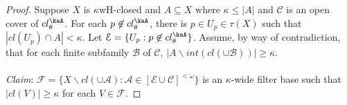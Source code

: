 \documentclass[11pt]{amsart}
\theoremstyle{definition}
\theoremstyle{remark}
\numberwithin{equation}{section}
\begin{document}
\begin{proof} 
Suppose $X$ is $\kappa$wH-closed and  $A \subseteq X$ where $\kappa \leq |A|$ and ${\ensuremath{\mathcal{{C}}}}$ is an open cover of $cl_{\theta }^\kaA $.  For each $p \not\in cl_{\theta }^\kaA $, there is $p \in U_p \in\tau(X)$ such that  $|cl(U_p) \cap A| < \kappa$.  Let ${\ensuremath{\mathcal{{E}}}} = \{ U_p: p \not\in cl_{\theta }^\kaA \}$.   Assume, by way of contradiction, that for each  finite subfamily ${\ensuremath{\mathcal{{B}}}}$ of ${\ensuremath{\mathcal{{C}}}}$,  $|A\backslash int(cl(\cup{\ensuremath{\mathcal{{B}}}}))| \geq \kappa$.\\\\
\emph{Claim}: ${\ensuremath{\mathcal{{F}}}} = \{X\backslash cl(\cup{\ensuremath{\mathcal{A}}}): {\ensuremath{\mathcal{A}}} \in  [{\ensuremath{\mathcal{{E}}}} \cup {\ensuremath{\mathcal{{C}}}}]^{<\omega}\}$ is an $\kappa$-wide filter base such that $|cl(V)| \geq \kappa$ for each $V \in {\ensuremath{\mathcal{{F}}}}$.


\end{proof}
\end{document}
